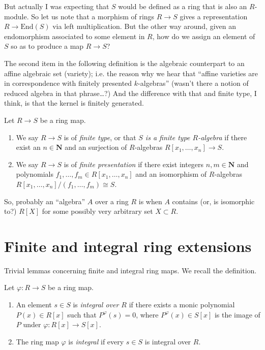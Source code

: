\noindent
But actually I was expecting that 
$S$ would be defined as 
a ring that is also an $R$-module.
So let us note that a morphism of rings
$R \to S$ gives a representation
$R \to \text{End}(S)$ via left multiplication.
But the other way around,
given an endomorphism associated
to some element in $R$,
how do we assign an element of $S$
so as to produce a map $R \to S$?

\medskip\noindent
The second item in the following definition
is the algebraic counterpart to an
affine algebraic set (variety);
i.e. the reason why we hear that
``affine varieties are in correspondence
with finitely presented $k$-algebras''
(wasn't there a notion of reduced algebra in that phrase…?)
And the difference with that and finite type,
I think,
is that the kernel is finitely generated.

\begin{definition}
\label{definition-finite-type}
Let $R \to S$ be a ring map.
\begin{enumerate}
\item We say $R \to S$ is of {\it finite type}, or that {\it $S$ is a finite
type $R$-algebra} if there exist an $n \in \mathbf{N}$ and an surjection
of $R$-algebras $R[x_1, \ldots, x_n] \to S$.
\item We say $R \to S$ is of {\it finite presentation} if there
exist integers $n, m \in \mathbf{N}$ and polynomials
$f_1, \ldots, f_m \in R[x_1, \ldots, x_n]$
and an isomorphism of $R$-algebras
$R[x_1, \ldots, x_n]/(f_1, \ldots, f_m) \cong S$.
\end{enumerate}
\end{definition}

So, probably an ``algebra'' $A$ over a ring  $R$ is when $A$ contains 
(or, is isomorphic to?)  $R[X]$ for some possibly very arbitrary set
 $X\subset R$.


\section{Finite and integral ring extensions}
\label{section-finite-ring-extensions}

Trivial lemmas concerning finite and integral ring maps.
We recall the definition.

\begin{definition}
\label{definition-integral-ring-map}
Let $\varphi : R \to S$ be a ring map.
\begin{enumerate}
\item An element $s \in S$
is {\it integral over $R$} if there exists a monic
polynomial $P(x) \in R[x]$ such that
$P^\varphi(s) = 0$, where $P^\varphi(x) \in S[x]$
is the image of $P$ under $\varphi : R[x] \to S[x]$.
\item  The ring map $\varphi$ is {\it integral}
if every $s \in S$ is integral over $R$.
\end{enumerate}
\end{definition}

